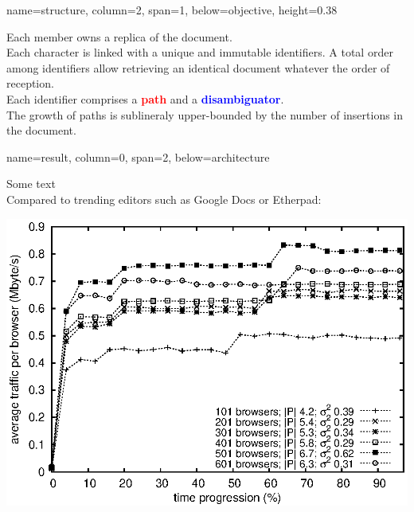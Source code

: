 \documentclass[a1paper, fontscale=0.38, portrait]{baposter}
\newcommand{\RED}[1]{\textcolor{red}{\textbf{#1}}}
\newcommand{\BLUE}[1]{\textcolor{blue}{\textbf{#1}}}
\newcommand{\SECONDCOL}{0.38}
\begin{document}
\begin{poster}
{  }

  {name=structure, column=2, span=1, below=objective, height=\SECONDCOL}{
    \begin{center}
      
    \end{center}
    Each member owns a replica of the document.\\
    Each character is linked with a unique and immutable identifiers. A total
    order among identifiers allow retrieving an identical document whatever the
    order of reception.\\
    Each identifier comprises a \RED{path} and a \BLUE{disambiguator}. \\
    The growth of paths is sublineraly upper-bounded by the number of insertions in
    the document.   
}

  {name=result, column=0, span=2, below=architecture}{
    \begin{minipage}[c]{.5\linewidth}
      Some text \\
      Compared to trending editors such as Google Docs or Etherpad:      
    \end{minipage} \hfill
    \begin{minipage}[c]{.5\linewidth}
      \centering
      \includegraphics[scale=0.5]{img/traffic.eps}
    \end{minipage}

  }


\end{poster}
\end{document}
